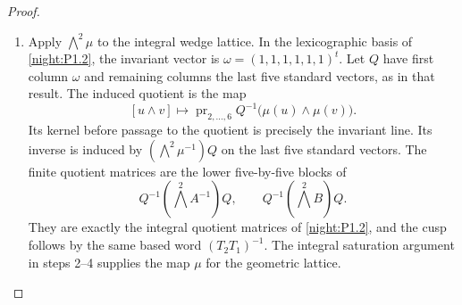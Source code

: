 \documentclass[11pt,a4paper]{article}
\numberwithin{equation}{section}
\theoremstyle{definition}
\begin{document}
\begin{proof}
\begin{enumerate}[label=\arabic*.]
\item Apply $\bigwedge^2\mu$ to the integral wedge lattice. In the
lexicographic basis of \cref{night:P1.2}, the invariant vector is
$\omega=(1,1,1,1,1,1)^t$. Let $Q$ have first column $\omega$ and
remaining columns the last five standard vectors, as in that result.
The induced quotient is the map
\[
 [u\wedge v]\longmapsto
 \operatorname{pr}_{2,\ldots,6}
 Q^{-1}\bigl(\mu(u)\wedge\mu(v)\bigr).
\]
Its kernel before passage to the quotient is precisely the invariant
line. Its inverse is induced by $(\bigwedge^2\mu^{-1})Q$ on the last
five standard vectors. The finite quotient matrices are the lower
five-by-five blocks of
\[
 Q^{-1}(\bigwedge^2 A^{-1})Q,\qquad
 Q^{-1}(\bigwedge^2 B)Q.
\]
They are exactly the integral quotient matrices of
\cref{night:P1.2}, and the cusp follows by the same based word
$(T_2T_1)^{-1}$.
The integral saturation argument in steps 2--4 supplies the map $\mu$
for the geometric lattice.
\end{enumerate}
\end{proof}
\end{document}

